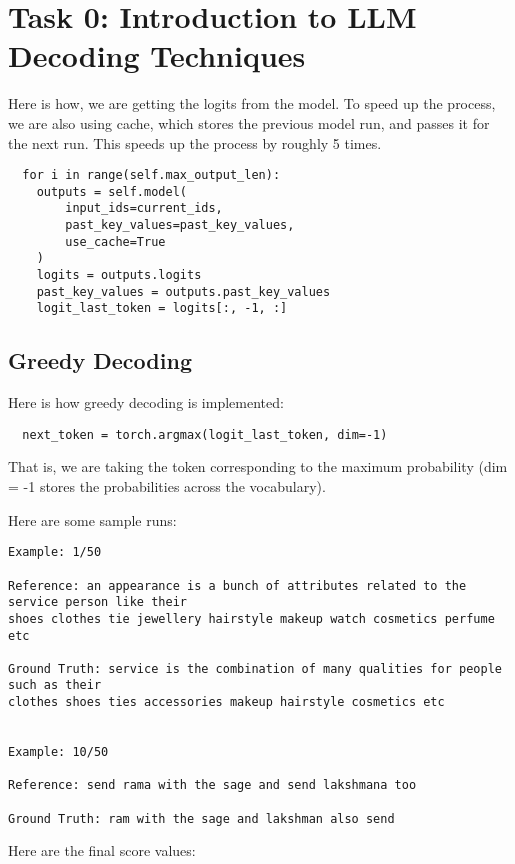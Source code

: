 \documentclass[a4paper,12pt]{article}
\title{\cooltitle{CS726 Programming Assignment -- 3 Report}}
\author{
\textbf{Saksham Rathi (22B1003)}\\
\textbf{Sharvanee Sonawane (22B0943)}\\
\textbf{Deeksha Dhiwakar (22B0988)}\\
\small Department of Computer Science, \\
Indian Institute of Technology Bombay \\}
\date{}
\begin{document}
\maketitle

\section{Task 0: Introduction to LLM Decoding Techniques}

Here is how, we are getting the logits from the model. To speed up the process, we are also using cache, which stores the previous model run, and passes it for the next run. This speeds up the process by roughly 5 times. 
\begin{verbatim}
  for i in range(self.max_output_len):
    outputs = self.model(
        input_ids=current_ids,
        past_key_values=past_key_values,
        use_cache=True
    )
    logits = outputs.logits
    past_key_values = outputs.past_key_values
    logit_last_token = logits[:, -1, :]
\end{verbatim}

\subsection{Greedy Decoding}
Here is how greedy decoding is implemented:
\begin{verbatim}
  next_token = torch.argmax(logit_last_token, dim=-1)
\end{verbatim}

That is, we are taking the token corresponding to the maximum probability (dim = -1 stores the probabilities across the vocabulary). 


Here are some sample runs:

\begin{verbatim}
Example: 1/50

Reference: an appearance is a bunch of attributes related to the service person like their 
shoes clothes tie jewellery hairstyle makeup watch cosmetics perfume etc

Ground Truth: service is the combination of many qualities for people such as their 
clothes shoes ties accessories makeup hairstyle cosmetics etc


Example: 10/50

Reference: send rama with the sage and send lakshmana too

Ground Truth: ram with the sage and lakshman also send
\end{verbatim}
Here are the final score values:
\end{document}
